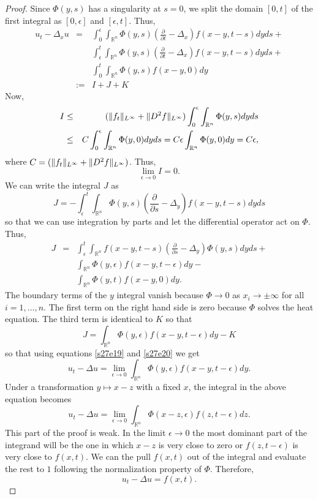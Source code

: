 \documentclass{article}
\DeclarePairedDelimiter\norm{\lVert}{\rVert}
\theoremstyle{plain}
\numberwithin{thm}{section}
\theoremstyle{plain}
\numberwithin{prop}{section}
\theoremstyle{definition}
\numberwithin{defn}{section}
\theoremstyle{remark}
\numberwithin{equation}{section}
\begin{document}
\begin{proof}
Since $\Phi(y, s)$ has a singularity at $s = 0$, we split the domain
$[0, t]$ of the first integral as $[0, \epsilon]$ and $[\epsilon, t]$. Thus,
\begin{eqnarray*}
u_t - \Delta_x u &=& 
\int_0^\epsilon\int_{\mathbb{R}^n}\Phi(y, s)\left(\frac{\partial}{\partial t}-\Delta_x\right)f(x - y, t - s)dyds+\\
& & 
\int_\epsilon^t\int_{\mathbb{R}^n}\Phi(y, s)\left(\frac{\partial}{\partial t}-\Delta_x\right)f(x - y, t - s)dyds+\\
& & \int_0^t\int_{\mathbb{R}^n}\Phi(y, s)f(x - y, 0)dy \\
&:=& I + J + K
\end{eqnarray*}
Now,
\begin{eqnarray*}
I &\le& (\norm{f_t}_{L^\infty} + \norm{D^2f}_{L^\infty})\int_0^\epsilon\int_{\mathbb{R}^n}\Phi(y, s)dyds \\
&\le& C\int_0^\epsilon\int_{\mathbb{R}^n}\Phi(y, 0)dyds = C\epsilon\int_{\mathbb{R}^n}\Phi(y, 0)dy = C\epsilon,
\end{eqnarray*}
where $C = (\norm{f_t}_{L^\infty} + \norm{D^2f}_{L^\infty})$. Thus,
\begin{equation}\label{s27e19}
\lim_{\epsilon\rightarrow 0} I = 0.
\end{equation}
We can write the integral $J$ as
\[
J = 
-\int_\epsilon^t\int_{\mathbb{R}^n}\Phi(y, s)\left(\frac{\partial}{\partial s}-\Delta_y\right)f(x-y, t-s)dyds
\]
so that we can use integration by parts and let the differential operator act on $\Phi$. Thus,
\begin{eqnarray*}
J &=& 
\int_\epsilon^t\int_{\mathbb{R}^n}f(x-y, t-s)\left(\frac{\partial}{\partial s}-\Delta_y\right)\Phi(y, s)dyds + \\
& & \int_{\mathbb{R}^n}\Phi(y, \epsilon)f(x-y,t-\epsilon)dy - \\
& & \int_{\mathbb{R}^n}\Phi(y,t)f(x-y,0)dy.
\end{eqnarray*}
The boundary terms of the $y$ integral vanish because $\Phi \rightarrow 0$ as $x_i \rightarrow \pm\infty$ for all
$i = 1, \ldots, n$. The first term on the right hand side is zero because $\Phi$ solves the heat equation. The
third term is identical to $K$ so that
\begin{equation}\label{s27e20}
J = \int_{\mathbb{R}^n}\Phi(y, \epsilon)f(x-y,t-\epsilon)dy - K
\end{equation}
so that using equations \eqref{s27e19} and \eqref{s27e20} we get
\[
u_t - \Delta u = \lim_{\epsilon\rightarrow 0}\int_{\mathbb{R}^n}\Phi(y, \epsilon)f(x-y,t-\epsilon)dy.
\]
Under a transformation $y \mapsto x - z$ with a fixed $x$, the integral in the above equation becomes
\[
u_t - \Delta u = \lim_{\epsilon\rightarrow 0}\int_{\mathbb{R}^n}\Phi(x - z, \epsilon)f(z,t-\epsilon)dz.
\]
{\color{red}This part of the proof is weak. In the limit $\epsilon \rightarrow 0$ the most dominant part of the
integrand will be the one in which $x - z$ is very close to zero or $f(z, t - \epsilon)$ is very close to 
$f(x, t)$. We can the pull $f(x, t)$ out of the integral and evaluate the rest to $1$ following the normalization
property of $\Phi$.} Therefore,
\[
u_t - \Delta u = f(x, t).
\]


\end{proof}
\end{document}
